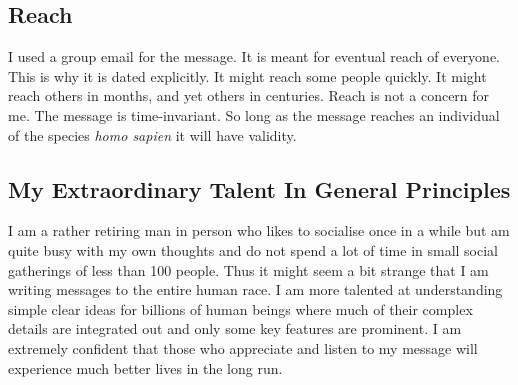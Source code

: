 \documentclass{amsart}
\begin{document}
\subsection{Reach}

I used a group email for the message.  It is meant for eventual reach of everyone.  This is why it is dated explicitly.  It might reach some people quickly.  It might reach others in months, and yet others in centuries.  Reach is not a concern for me.  The message is time-invariant.  So long as the message reaches an individual of the species {\em homo sapien} it will have validity.

\subsection{My Extraordinary Talent In General Principles}

I am a rather retiring man in person who likes to socialise once in a while but am quite busy with my own thoughts and do not spend a lot of time in small social gatherings of less than 100 people.  Thus it might seem a bit strange that I am writing messages to the entire human race.  I am more talented at understanding simple clear ideas for billions of human beings where much of their complex details are integrated out and only some key features are prominent.  I am extremely confident that those who appreciate and listen to my message will experience much better lives in the long run.
\end{document}

